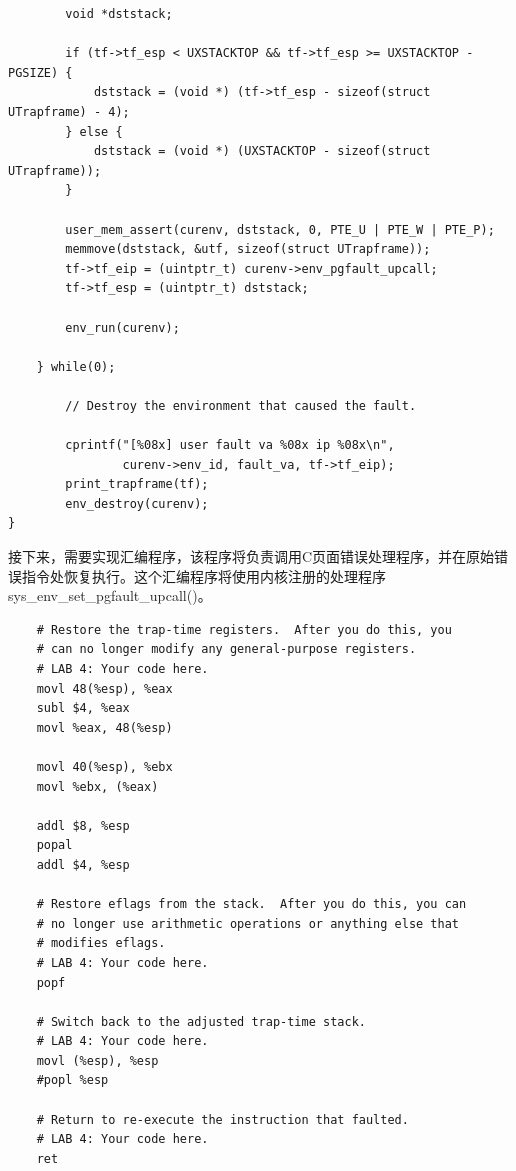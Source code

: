 \begin{ExerciseList}
\begin{verbatim}
        void *dststack;

        if (tf->tf_esp < UXSTACKTOP && tf->tf_esp >= UXSTACKTOP - PGSIZE) {
            dststack = (void *) (tf->tf_esp - sizeof(struct UTrapframe) - 4);
        } else {
            dststack = (void *) (UXSTACKTOP - sizeof(struct UTrapframe));
        }

        user_mem_assert(curenv, dststack, 0, PTE_U | PTE_W | PTE_P);
        memmove(dststack, &utf, sizeof(struct UTrapframe));
        tf->tf_eip = (uintptr_t) curenv->env_pgfault_upcall;
        tf->tf_esp = (uintptr_t) dststack;

        env_run(curenv);

    } while(0);

        // Destroy the environment that caused the fault.

        cprintf("[%08x] user fault va %08x ip %08x\n",
                curenv->env_id, fault_va, tf->tf_eip);
        print_trapframe(tf);
        env_destroy(curenv);
}
\end{verbatim}

接下来，需要实现汇编程序，该程序将负责调用C页面错误处理程序，并在原始错误指令处恢复执行。这个汇编程序将使用内核注册的处理程序sys\_env\_set\_pgfault\_upcall()。


\begin{verbatim}
    # Restore the trap-time registers.  After you do this, you
    # can no longer modify any general-purpose registers.
    # LAB 4: Your code here.
    movl 48(%esp), %eax
    subl $4, %eax
    movl %eax, 48(%esp)

    movl 40(%esp), %ebx
    movl %ebx, (%eax)

    addl $8, %esp
    popal
    addl $4, %esp

    # Restore eflags from the stack.  After you do this, you can
    # no longer use arithmetic operations or anything else that
    # modifies eflags.
    # LAB 4: Your code here.
    popf

    # Switch back to the adjusted trap-time stack.
    # LAB 4: Your code here.
    movl (%esp), %esp
    #popl %esp

    # Return to re-execute the instruction that faulted.
    # LAB 4: Your code here.
    ret
\end{verbatim}


\end{ExerciseList}
